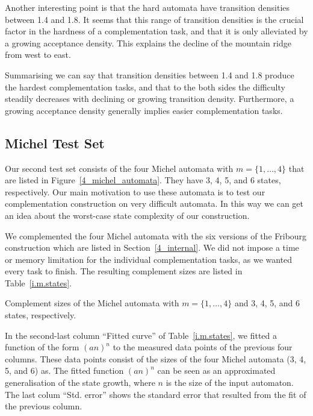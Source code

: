 Another interesting point is that the hard automata have transition densities between 1.4 and 1.8. It seems that this range of transition densities is the crucial factor in the hardness of a complementation task, and that it is only alleviated by a growing acceptance density. This explains the decline of the mountain ridge from west to east.

Summarising we can say that transition densities between 1.4 and 1.8 produce the hardest complementation tasks, and that to the both sides the difficulty steadily decreases with declining or growing transition density. Furthermore, a growing acceptance density generally implies easier complementation tasks.


\subsection{Michel Test Set}
\label{5_internal_michel}
Our second test set consists of the four Michel automata with $m=\{1,\dots,4\}$ that are listed in Figure~\ref{4_michel_automata}. They have 3, 4, 5, and 6 states, respectively. Our main motivation to use these automata is to test our complementation construction on very difficult automata. In this way we can get an idea about the worst-case state complexity of our construction.

We complemented the four Michel automata with the six versions of the Fribourg construction which are listed in Section~\ref{4_internal}. We did not impose a time or memory limitation for the individual complementation tasks, as we wanted every task to finish. The resulting complement sizes are listed in Table~\ref{i.m.states}.

\begin{table}[htb]
\centering

\caption{Complement sizes of the Michel automata with $m=\{1,\dots,4\}$ and 3, 4, 5, and 6 states, respectively. }
\label{i.m.states}
\end{table}

In the second-last column ``Fitted curve'' of Table~\ref{i.m.states}, we fitted a function of the form $(an)^n$ to the measured data points of the previous four columns. These data points consist of the sizes of the four Michel automata (3, 4, 5, and 6) as. The fitted function $(an)^n$ can be seen as an approximated generalisation of the state growth, where $n$ is the size of the input automaton. The last colum ``Std. error'' shows the standard error that resulted from the fit of the previous column.

